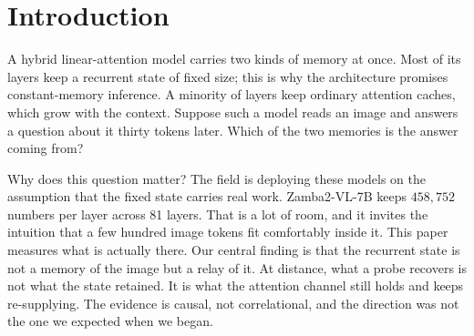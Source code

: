 \documentclass{article}
\begin{document}
\section{Introduction}

A hybrid linear-attention model carries two kinds of memory at once. Most of
its layers keep a recurrent state of fixed size; this is why the architecture
promises constant-memory inference. A minority of layers keep ordinary
attention caches, which grow with the context. Suppose such a model reads an
image and answers a question about it thirty tokens later. Which of the two
memories is the answer coming from?

Why does this question matter? The field is deploying these models on the
assumption that the fixed state carries real work. Zamba2-VL-7B keeps
$458{,}752$ numbers per layer across 81 layers. That is a lot of room, and it
invites the intuition that a few hundred image tokens fit comfortably inside
it. This paper measures what is actually there. Our central finding is that
the recurrent state is not a memory of the image but a relay of it. At
distance, what a probe recovers is not what the state retained. It is what the
attention channel still holds and keeps re-supplying. The evidence is causal,
not correlational, and the direction was not the one we expected when we
began.
\end{document}
